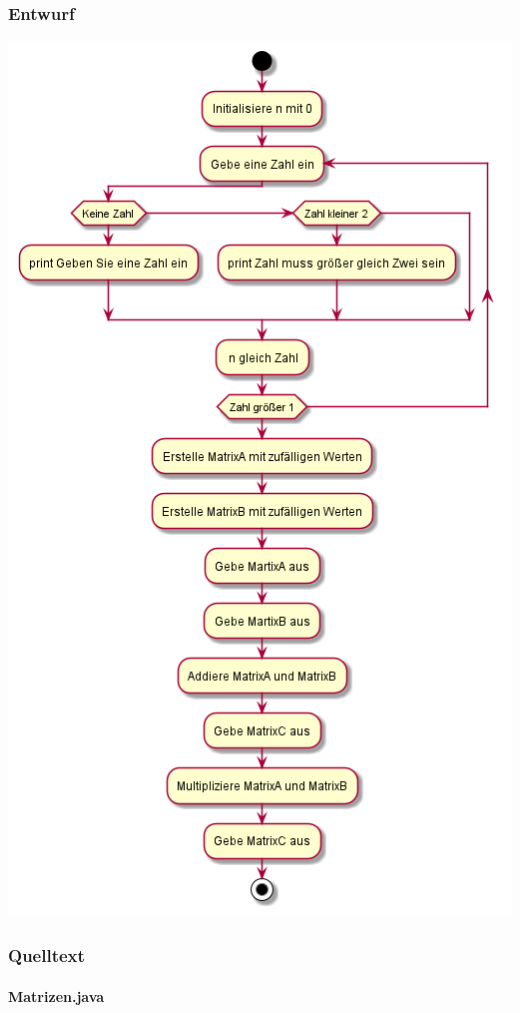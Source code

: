 \subsubsection{Entwurf}
\includegraphics[scale=0.55]{uml/uml_c6_p1.png}

\subsubsection{Quelltext}
\paragraph{Matrizen.java}\


